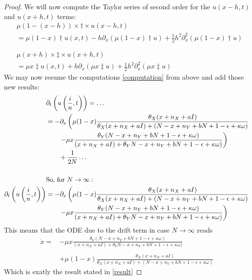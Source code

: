 \begin{proof}
We will now compute the Taylor series of second order for the $u\left(x-h,t\right)$ and $u\left(x+h,t\right)$ terms:
\begin{align*}
	&\mu(1-(x-h))\times \dagger \times u\left(x-h,t \right)\\
	&= \mu(1-x)\dagger u\left(x,t\right) - h\partial_x \left(\mu(1-x)\dagger u\right)+\frac{1}{2}h^2\partial^2_x\left(\mu(1-x)\dagger u\right)\\
	&\\
	&\\
	&\mu(x+h)\times \ddagger \times u\left(x+h,t\right) \\
	&= \mu x \ddagger u(x,t) + h\partial_x \left(\mu x \ddagger u\right) + \frac{1}{2}h^2\partial^2_x\left(\mu x\ddagger u\right)
\end{align*}
We may now resume the computations \eqref{computation} from above and add those new results:
\begin{align*}
&\partial_t \left(u\left(\frac{i}{n}, t\right)\right) = \dots \\
&= -\partial_x\left(\mu(1-x)\frac{\theta_X (x + n_X + aI)}{\theta_X (x + n_X + aI) + (N-x + n_Y + bN + 1-\epsilon + \kappa\omega)}\right.\\
&\left.\qquad - \mu x \frac{\theta_Y(N-x+n_Y + bN +1-\epsilon+\kappa\omega)}{(x + n_X+aI) + \theta_YN-x+n_Y + bN +1-\epsilon+\kappa\omega)} \right)\\
&\qquad + \frac{1}{2N} \dots\\
&\\
&\textnormal{So, for } N \rightarrow \infty: \\
\partial_t \left(u\left(\frac{i}{n}, t\right)\right)&= -\partial_x\left(\mu(1-x)\frac{\theta_X (x + n_X + aI)}{\theta_X (x + n_X + aI) + (N-x + n_Y + bN + 1-\epsilon + \kappa\omega)}\right.\\
&\left.\qquad - \mu x \frac{\theta_Y(N-x+n_Y + bN +1-\epsilon+\kappa\omega)}{(x + n_X+aI) + \theta_YN-x+n_Y + bN +1-\epsilon+\kappa\omega)} \right)
\end{align*}
This means that the ODE due to the drift term in case $N \rightarrow \infty$ reads 
\begin{align*}
	\dot{x} = &-\mu x\frac{\theta_Y(N-x+n_Y + bN +1-\epsilon+\kappa\omega)}{(x + n_X+aI) + \theta_YN-x+n_Y + bN +1-\epsilon+\kappa\omega)} \\
	&\\
	\qquad &+ \mu\left(1-x\right)\frac{\theta_X (x + n_X + aI)}{\theta_X (x + n_X + aI) + (N-x + n_Y + bN + 1-\epsilon + \kappa\omega)}
\end{align*}
Which is exatly the result stated in \eqref{result}
\end{proof}